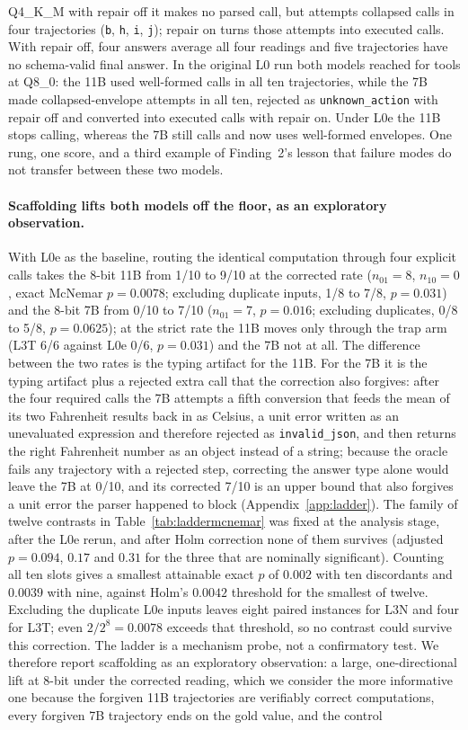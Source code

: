 \documentclass[11pt]{article}
\begin{document}
Q4\_K\_M with repair off it makes no parsed call, but attempts collapsed calls in four trajectories (\texttt{b}, \texttt{h}, \texttt{i}, \texttt{j}); repair on turns those attempts into executed calls. With repair off, four answers average all four readings and five trajectories have no schema-valid final answer. In the original L0 run both models reached for tools at Q8\_0: the 11B used well-formed calls in all ten trajectories, while the 7B made collapsed-envelope attempts in all ten, rejected as \texttt{unknown\_action} with repair off and converted into executed calls with repair on. Under L0e the 11B stops calling, whereas the 7B still calls and now uses well-formed envelopes. One rung, one score, and a third example of Finding~2's lesson that failure modes do not transfer between these two models.

\paragraph{Scaffolding lifts both models off the floor, as an exploratory observation.} With L0e as the baseline, routing the identical computation through four explicit calls takes the 8-bit 11B from 1/10 to 9/10 at the corrected rate ($n_{01}=8$, $n_{10}=0$, exact McNemar $p=0.0078$; excluding duplicate inputs, 1/8 to 7/8, $p=0.031$) and the 8-bit 7B from 0/10 to 7/10 ($n_{01}=7$, $p=0.016$; excluding duplicates, 0/8 to 5/8, $p=0.0625$); at the strict rate the 11B moves only through the trap arm (L3T 6/6 against L0e 0/6, $p=0.031$) and the 7B not at all. The difference between the two rates is the typing artifact for the 11B. For the 7B it is the typing artifact plus a rejected extra call that the correction also forgives: after the four required calls the 7B attempts a fifth conversion that feeds the mean of its two Fahrenheit results back in as Celsius, a unit error written as an unevaluated expression and therefore rejected as \texttt{invalid\_json}, and then returns the right Fahrenheit number as an object instead of a string; because the oracle fails any trajectory with a rejected step, correcting the answer type alone would leave the 7B at 0/10, and its corrected 7/10 is an upper bound that also forgives a unit error the parser happened to block (Appendix~\ref{app:ladder}). The family of twelve contrasts in Table~\ref{tab:laddermcnemar} was fixed at the analysis stage, after the L0e rerun, and after Holm correction none of them survives (adjusted $p=0.094$, $0.17$ and $0.31$ for the three that are nominally significant). Counting all ten slots gives a smallest attainable exact $p$ of $0.002$ with ten discordants and $0.0039$ with nine, against Holm's $0.0042$ threshold for the smallest of twelve. Excluding the duplicate L0e inputs leaves eight paired instances for L3N and four for L3T; even $2/2^8=0.0078$ exceeds that threshold, so no contrast could survive this correction. The ladder is a mechanism probe, not a confirmatory test. We therefore report scaffolding as an exploratory observation: a large, one-directional lift at 8-bit under the corrected reading, which we consider the more informative one because the forgiven 11B trajectories are verifiably correct computations, every forgiven 7B trajectory ends on the gold value, and the control 
\end{document}
